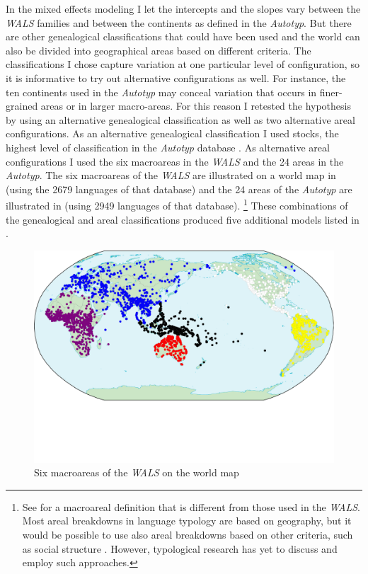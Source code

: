 \documentclass[output=collectionpaper]{langsci/langscibook}
\begin{document}
In the mixed effects modeling I let the intercepts and the slopes vary between the \textit{WALS} families and between the continents as defined in the \textit{Autotyp}. But there are other genealogical classifications that could have been used and the world can also be divided into geographical areas based on different criteria. The classifications I chose capture variation at one particular level of configuration, so it is informative to try out alternative configurations as well. For instance, the ten continents used in the \textit{Autotyp} may conceal variation that occurs in finer-grained areas or in larger macro-areas. For this reason I retested the hypothesis by using an alternative genealogical classification as well as two alternative areal configurations. As an alternative genealogical classification I used stocks, the highest level of classification in the \textit{Autotyp} database \citep{Bickel2017}. As alternative areal configurations I used the six macroareas in the \textit{WALS} and the 24 areas in the \textit{Autotyp}. The six macroareas of the \textit{WALS} are illustrated on a world map in  (using the 2679 languages of that database) and the 24 areas of the \textit{Autotyp} are illustrated in  (using 2949 languages of that database).%
\footnote{See \citet{Hammarstroem2014} for a macroareal definition that is different from those used in the \textit{WALS}. Most areal breakdowns in language typology are based on geography, but it would be possible to use also areal breakdowns based on other criteria, such as social structure \citep{Burton1996}. However, typological research has yet to discuss and employ such approaches.} These combinations of the genealogical and areal classifications produced five additional models listed in .

\begin{figure}[t]
\includegraphics[width=\textwidth]{figures/13/Fig7_Map6areas_s}
\caption{Six macroareas of the \textit{WALS} on the world map}
\label{fig:Sinne:7}
\end{figure}
\end{document}
